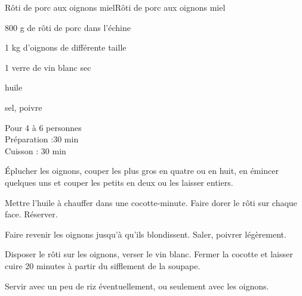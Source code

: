 \begin{recette}{Rôti de porc aux oignons miel}{Rôti de porc aux oignons miel}

\begin{ingredients}
800 g de rôti de porc dans l'échine\par
1 kg d'oignons de différente taille\par
1 verre de vin blanc sec\par
huile\par
sel, poivre\par
\end{ingredients}

\begin{infos}
Pour 4 à 6 personnes\\
Préparation :30 min\\
Cuisson : 30 min\\
\end{infos}

\begin{etapes}
\item Éplucher les oignons, couper les plus gros en quatre ou en huit, en émincer quelques uns et couper les petits en deux ou les laisser entiers.
\item Mettre l'huile à chauffer dans une cocotte-minute. Faire dorer le rôti sur chaque face. Réserver.
\item Faire revenir les oignons jusqu'à qu'ils blondissent. Saler, poivrer légèrement.
\item Disposer le rôti sur les oignons, verser le vin blanc. Fermer la cocotte et laisser cuire 20 minutes à partir du sifflement de la soupape.
\item Servir avec un peu de riz éventuellement, ou seulement avec les oignons.
\end{etapes}

\end{recette}